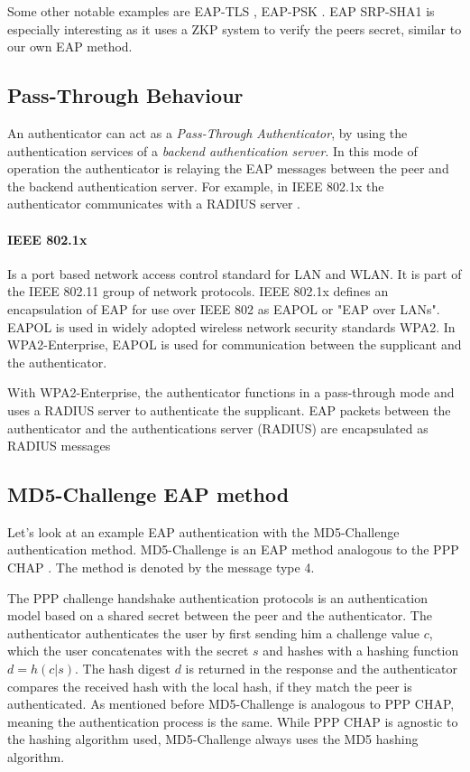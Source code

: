 Some other notable examples are EAP-TLS \cite{simon2008eap}, EAP-PSK \cite{bersani2007eap}.
EAP SRP-SHA1 \cite{carlson135eap} is especially interesting as it uses a ZKP system to verify the peers secret, similar to our own EAP method.

\subsection{Pass-Through Behaviour}
An authenticator can act as a \textit{Pass-Through Authenticator}, by using the authentication services of a \textit{backend authentication server}.
In this mode of operation the authenticator is relaying the EAP messages between the peer and the backend authentication server.
For example, in IEEE 802.1x the authenticator communicates with a RADIUS server \cite{congdon2003ieee}.

\paragraph{IEEE 802.1x}

Is a port based network access control standard for LAN and WLAN.
It is part of the IEEE 802.11 group of network protocols.
IEEE 802.1x defines an encapsulation of EAP for use over IEEE 802 as EAPOL or "EAP over LANs".
EAPOL is used in widely adopted wireless network security standards WPA2. 
In WPA2-Enterprise, EAPOL is used for communication between the supplicant and the authenticator.

With WPA2-Enterprise, the authenticator functions in a pass-through mode and uses a RADIUS server to authenticate the supplicant.
EAP packets between the authenticator and the authentications server (RADIUS) are encapsulated as RADIUS messages \cite{aboba2003radius, chen2005extensible, congdon2003ieee}

\subsection{MD5-Challenge EAP method}
Let's look at an example EAP authentication with the MD5-Challenge authentication method.
MD5-Challenge is an EAP method analogous to the PPP CHAP \cite{simpson1996ppp}. The method is denoted by the message type 4.

The PPP challenge handshake authentication protocols is an authentication model based on a shared secret between the peer and the authenticator.
The authenticator authenticates the user by first sending him a challenge value $c$, which the user concatenates with the secret $s$ and hashes with a hashing function $d = h(c | s)$.
The hash digest $d$ is returned in the response and the authenticator compares the received hash with the local hash, if they match the peer is authenticated.
As mentioned before MD5-Challenge is analogous to PPP CHAP, meaning the authentication process is the same. While PPP CHAP is agnostic to the hashing algorithm used, MD5-Challenge always uses the MD5 hashing algorithm.

